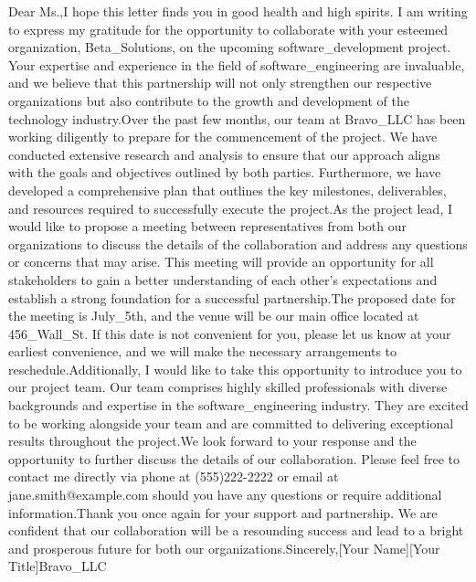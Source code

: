 Dear Ms.,I hope this letter finds you in good health and high spirits. I am writing to express my gratitude for the opportunity to collaborate with your esteemed organization, Beta_Solutions, on the upcoming software_development project. Your expertise and experience in the field of software_engineering are invaluable, and we believe that this partnership will not only strengthen our respective organizations but also contribute to the growth and development of the technology industry.Over the past few months, our team at Bravo_LLC has been working diligently to prepare for the commencement of the project. We have conducted extensive research and analysis to ensure that our approach aligns with the goals and objectives outlined by both parties. Furthermore, we have developed a comprehensive plan that outlines the key milestones, deliverables, and resources required to successfully execute the project.As the project lead, I would like to propose a meeting between representatives from both our organizations to discuss the details of the collaboration and address any questions or concerns that may arise. This meeting will provide an opportunity for all stakeholders to gain a better understanding of each other's expectations and establish a strong foundation for a successful partnership.The proposed date for the meeting is July_5th, and the venue will be our main office located at 456_Wall_St. If this date is not convenient for you, please let us know at your earliest convenience, and we will make the necessary arrangements to reschedule.Additionally, I would like to take this opportunity to introduce you to our project team. Our team comprises highly skilled professionals with diverse backgrounds and expertise in the software_engineering industry. They are excited to be working alongside your team and are committed to delivering exceptional results throughout the project.We look forward to your response and the opportunity to further discuss the details of our collaboration. Please feel free to contact me directly via phone at (555)222-2222 or email at jane.smith@example.com should you have any questions or require additional information.Thank you once again for your support and partnership. We are confident that our collaboration will be a resounding success and lead to a bright and prosperous future for both our organizations.Sincerely,[Your Name][Your Title]Bravo_LLC
